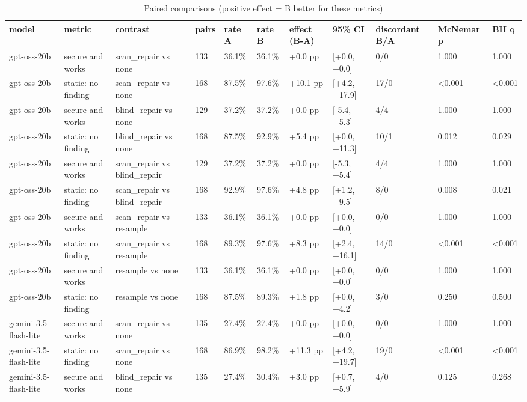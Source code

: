 \begin{table}[t]\centering\small
\caption{Paired comparisons (positive effect = B better for these metrics)}
\begin{tabular}{lllllllllll}
\toprule
model & metric & contrast & pairs & rate A & rate B & effect (B-A) & 95\% CI & discordant B/A & McNemar p & BH q \\
\midrule
gpt-oss-20b & secure and works & scan\_repair vs none & 133 & 36.1\% & 36.1\% & +0.0 pp & [+0.0, +0.0] & 0/0 & 1.000 & 1.000 \\
gpt-oss-20b & static: no finding & scan\_repair vs none & 168 & 87.5\% & 97.6\% & +10.1 pp & [+4.2, +17.9] & 17/0 & <0.001 & <0.001 \\
gpt-oss-20b & secure and works & blind\_repair vs none & 129 & 37.2\% & 37.2\% & +0.0 pp & [-5.4, +5.3] & 4/4 & 1.000 & 1.000 \\
gpt-oss-20b & static: no finding & blind\_repair vs none & 168 & 87.5\% & 92.9\% & +5.4 pp & [+0.0, +11.3] & 10/1 & 0.012 & 0.029 \\
gpt-oss-20b & secure and works & scan\_repair vs blind\_repair & 129 & 37.2\% & 37.2\% & +0.0 pp & [-5.3, +5.4] & 4/4 & 1.000 & 1.000 \\
gpt-oss-20b & static: no finding & scan\_repair vs blind\_repair & 168 & 92.9\% & 97.6\% & +4.8 pp & [+1.2, +9.5] & 8/0 & 0.008 & 0.021 \\
gpt-oss-20b & secure and works & scan\_repair vs resample & 133 & 36.1\% & 36.1\% & +0.0 pp & [+0.0, +0.0] & 0/0 & 1.000 & 1.000 \\
gpt-oss-20b & static: no finding & scan\_repair vs resample & 168 & 89.3\% & 97.6\% & +8.3 pp & [+2.4, +16.1] & 14/0 & <0.001 & <0.001 \\
gpt-oss-20b & secure and works & resample vs none & 133 & 36.1\% & 36.1\% & +0.0 pp & [+0.0, +0.0] & 0/0 & 1.000 & 1.000 \\
gpt-oss-20b & static: no finding & resample vs none & 168 & 87.5\% & 89.3\% & +1.8 pp & [+0.0, +4.2] & 3/0 & 0.250 & 0.500 \\
gemini-3.5-flash-lite & secure and works & scan\_repair vs none & 135 & 27.4\% & 27.4\% & +0.0 pp & [+0.0, +0.0] & 0/0 & 1.000 & 1.000 \\
gemini-3.5-flash-lite & static: no finding & scan\_repair vs none & 168 & 86.9\% & 98.2\% & +11.3 pp & [+4.2, +19.7] & 19/0 & <0.001 & <0.001 \\
gemini-3.5-flash-lite & secure and works & blind\_repair vs none & 135 & 27.4\% & 30.4\% & +3.0 pp & [+0.7, +5.9] & 4/0 & 0.125 & 0.268 \\

\end{tabular}
\end{table}
